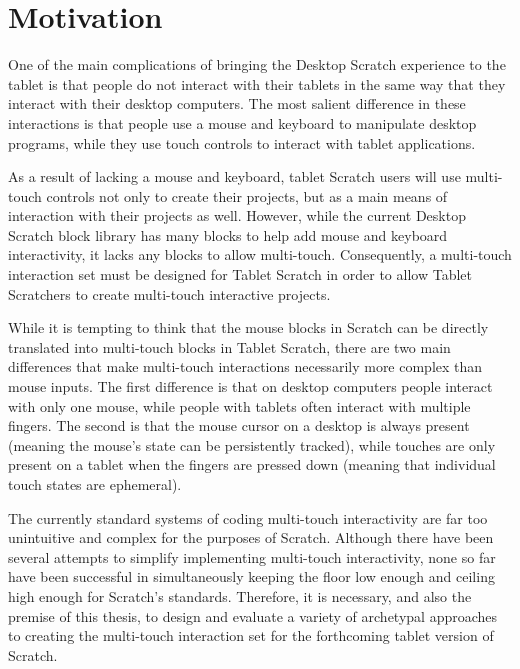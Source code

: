 \section{Motivation}
One of the main complications of bringing the Desktop Scratch experience to the tablet is that people do not interact with their tablets in the same way that they interact with their desktop computers. The most salient difference in these interactions is that people use a mouse and keyboard to manipulate desktop programs, while they use touch controls to interact with tablet applications.

As a result of lacking a mouse and keyboard, tablet Scratch users will use multi-touch controls not only to create their projects, but as a main means of interaction with their projects as well. However, while the current Desktop Scratch block library has many blocks to help add mouse and keyboard interactivity, it lacks any blocks to allow multi-touch. Consequently, a multi-touch interaction set must be designed for Tablet Scratch in order to allow Tablet Scratchers to create multi-touch interactive projects.

While it is tempting to think that the mouse blocks in Scratch can be directly translated into multi-touch blocks in Tablet Scratch, there are two main differences that make multi-touch interactions necessarily more complex than mouse inputs. The first difference is that on desktop computers people interact with only one mouse, while people with tablets often interact with multiple fingers. The second is that the mouse cursor on a desktop is always present (meaning the mouse's state can be persistently tracked), while touches are only present on a tablet when the fingers are pressed down (meaning that individual touch states are ephemeral).

The currently standard systems of coding multi-touch interactivity are far too unintuitive and complex for the purposes of Scratch. Although there have been several attempts to simplify implementing multi-touch interactivity, none so far have been successful in simultaneously keeping the floor low enough and ceiling high enough for Scratch's standards. Therefore, it is necessary, and also the premise of this thesis, to design and evaluate a variety of archetypal approaches to creating the multi-touch interaction set for the forthcoming tablet version of Scratch.

